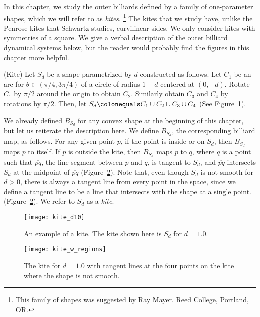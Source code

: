 \documentclass[10pt,twoside,draft]{book}
\begin{document}
In this chapter, we study the outer billiards defined by a family of one-parameter shapes, which we will refer to as \textit{kites}.
\footnote{This family of shapes was suggested by Ray Mayer. Reed College, Portland, OR.}
The kites that we study have, unlike the Penrose kites that Schwartz studies, curvilinear sides.
We only consider kites with symmetries of a square.
We give a verbal description of the outer billiard dynamical systems below, but the reader would probably find the figures in this chapter more helpful.
\begin{definition}
  (Kite)
  Let $S_d$ be a shape parametrized by $d$ constructed as follows.
  Let $C_1$ be an arc for $\theta \in (\pi/4, 3\pi/4)$ of a circle of radius $1+d$ centered at $(0,-d)$.
  Rotate $C_1$ by $\pi/2$ around the origin to obtain $C_2$.
  Similarly obtain $C_3$ and $C_4$ by rotations by $\pi/2$.
  Then, let $S_d \ceq C_1 \cup C_2 \cup C_3 \cup C_4$ (See Figure~\ref{fig:kiteeg}).

  We already defined $B_{S_d}$ for any convex shape at the beginning of this chapter, but let us reiterate the description here.
  We define $B_{S_d}$, the corresponding billiard map, as follows.
  For any given point $p$, if the point is inside or on $S_d$, then $B_{S_d}$ maps $p$ to itself.
  If $p$ is outside the kite, then $B_{S_d}$ maps $p$ to $q$, where $q$ is a point such that $\overline{pq}$, the line segment between $p$ and $q$, is tangent to $S_d$, and $\overline{pq}$ intersects $S_d$ at the midpoint of $\overline{pq}$ (Figure~\ref{fig:kite-regions}).
  Note that, even though $S_d$ is not smooth for $d > 0$, there is always a tangent line from every point in the space, since we define a tangent line to be a line that intersects with the shape at a single point.
 (Figure~\ref{fig:kite-regions}).
  We refer to $S_d$ as a \textit{kite}.

\end{definition}
\begin{figure}[ht]
  \begin{center}
    \texttt{[image: kite\_d10]}
    \caption{An example of a kite. The kite shown here is $S_d$ for $d = 1.0$.}
    \label{fig:kiteeg}
  \end{center}
\end{figure}
\begin{figure}[ht]
  \begin{center}
    \texttt{[image: kite\_w\_regions]}
    \caption{The kite for $d = 1.0$ with tangent lines at the four points on the kite where the shape is not smooth.}
    \label{fig:kite-regions}
  \end{center}
\end{figure}
\end{document}
